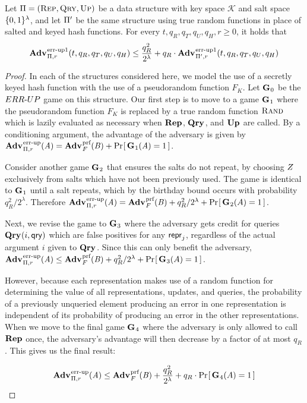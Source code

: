 \begin{lemma}\label{lemma:keytorand}
  Let $\mathrm{\Pi} = (\textnormal{\textsc{Rep}}, \textnormal{\textsc{Qry}}, \textnormal{\textsc{Up}})$ be a data structure with key space $\mathcal{K}$ and salt space $\{0,1\}^\lambda$, and let $\mathrm{\Pi}'$ be the same structure using true random functions in place of salted and keyed hash functions. For every $t, q_R, q_T, q_U, q_H, r \geq 0$, it holds that
  \[
    \Adv{\errep1}_{\struct,r}(t, q_R, q_T, q_U, q_H) \leq \frac{q_R^2}{2^\lambda} + q_R \cdot \Adv{\errep1}_{\struct',r}(t, q_R, q_T, q_U, q_H)
  \]
\end{lemma}

\begin{proof}
In each of the structures considered here, we model the use of a secretly keyed hash function with the use of a pseudorandom function $F_K$. Let $\textup{\textbf{G}}\hspace{0.5pt}_0$ be the ${ERR\mbox{-}UP}$ game on this structure. Our first step is to move to a game $\textup{\textbf{G}}\hspace{0.5pt}_1$ where the pseudorandom function $F_K$ is replaced by a true random function $\textnormal{\textsc{Rand}}$ which is lazily evaluated as necessary when $\textup{\textbf{Rep}}\hspace{0.5pt}$, $\textup{\textbf{Qry}}\hspace{0.5pt}$, and $\textup{\textbf{Up}}\hspace{0.5pt}$ are called. By a conditioning argument, the advantage of the adversary is given by $\Adv{\errep}_{\struct,r}(\advA) = \Adv{\prf}_F(\advB) + \Prob{\game_1(\advA)=1}$.

Consider another game $\textup{\textbf{G}}\hspace{0.5pt}_2$ that ensures the salts do not repeat, by choosing $Z$ exclusively from salts which have not been previously used. The game is identical to $\textup{\textbf{G}}\hspace{0.5pt}_1$ until a salt repeats, which by the birthday bound occurs with probability $q_R^2/2^\lambda$. Therefore $\Adv{\errep}_{\struct,r}(\advA) = \Adv{\prf}_F(\advB) + q_R^2/2^\lambda + \Prob{\game_2(A) = 1}$.

Next, we revise the game to $\textup{\textbf{G}}\hspace{0.5pt}_3$ where the adversary gets credit for queries $\textup{\textbf{Qry}}\hspace{0.5pt}(i,\mathsf{qry})$ which are false positives for any $\mathsf{repr}_j$, regardless of the actual argument $i$ given to $\textup{\textbf{Qry}}\hspace{0.5pt}$. Since this can only benefit the adversary, $\Adv{\errep}_{\struct,r}(\advA) \le \Adv{\prf}_F(\advB) + q_R^2/2^\lambda + \Prob{\game_3(A) = 1}$.

However, because each representation makes use of a random function for determining the value of all representations, updates, and queries, the probability of a previously unqueried element producing an error in one representation is independent of its probability of producing an error in the other representations. When we move to the final game $\textup{\textbf{G}}\hspace{0.5pt}_4$ where the adversary is only allowed to call $\textup{\textbf{Rep}}\hspace{0.5pt}$ once, the adversary's advantage will then decrease by a factor of at most $q_R$. This gives us the final result:

$$\Adv{\errep}_{\struct,r}(\advA) \le \Adv{\prf}_F(\advB) + \frac{q_R^2}{2^\lambda} + q_R \cdot \Prob{\game_4(A) = 1}$$\missingqed
\end{proof}

